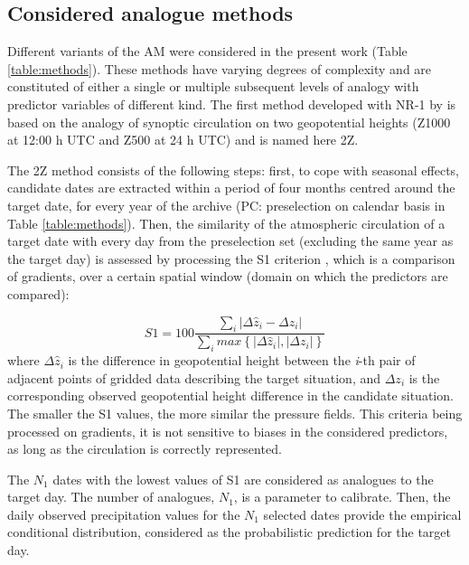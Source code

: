 \documentclass{ametsoc}
\begin{document}
\subsection{Considered analogue methods}
\label{sec:ams}

Different variants of the AM were considered in the present work (Table \ref{table:methods}). These methods have varying degrees of complexity and are constituted of either a single or multiple subsequent levels of analogy with predictor variables of different kind. The first method developed with NR-1 by \citet{Bontron2004} is based on the analogy of synoptic circulation on two geopotential heights (Z1000 at 12:00 h UTC and Z500 at 24 h UTC) and is named here 2Z.

The 2Z method consists of the following steps: first, to cope with seasonal effects, candidate dates are extracted within a period of four months centred around the target date, for every year of the archive (PC: preselection on calendar basis in Table \ref{table:methods}). Then, the similarity of the atmospheric circulation of a target date with every day from the preselection set (excluding the same year as the target day) is assessed by processing the S1 criterion \citep[Eq.\ \ref{eq:S1}, ][]{Teweles1954, Drosdowsky2003}, which is a comparison of gradients, over a certain spatial window (domain on which the predictors are compared):

\begin{equation}
\label{eq:S1}
S1=100 \frac {\displaystyle \sum_{i} \vert \Delta\hat{z}_{i} - \Delta z_{i} \vert}
{\displaystyle \sum_{i} max\left\lbrace \vert \Delta\hat{z}_{i} \vert , \vert \Delta z_{i} \vert \right\rbrace }
\end{equation}
where $\Delta \hat{z}_{i}$ is the difference in geopotential height between the \textit{i}-th pair of adjacent points of gridded data describing the target situation, and $\Delta z_{i}$ is the corresponding observed geopotential height difference in the candidate situation. The smaller the S1 values, the more similar the pressure fields. This criteria being processed on gradients, it is not sensitive to biases in the considered predictors, as long as the circulation is correctly represented.

The $N_{1}$ dates with the lowest values of S1 are considered as analogues to the target day. The number of analogues, $N_{1}$, is a parameter to calibrate. Then, the daily observed precipitation values for the $N_{1}$ selected dates provide the empirical conditional distribution, considered as the probabilistic prediction for the target day.
\end{document}
